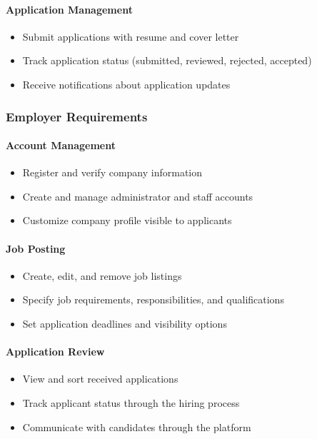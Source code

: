 \documentclass[12pt,a4paper]{article}
\begin{document}
\paragraph{Application Management}
\begin{itemize}
    \item Submit applications with resume and cover letter
    \item Track application status (submitted, reviewed, rejected, accepted)
    \item Receive notifications about application updates
\end{itemize}

\subsubsection{Employer Requirements}

\paragraph{Account Management}
\begin{itemize}
    \item Register and verify company information
    \item Create and manage administrator and staff accounts
    \item Customize company profile visible to applicants
\end{itemize}

\paragraph{Job Posting}
\begin{itemize}
    \item Create, edit, and remove job listings
    \item Specify job requirements, responsibilities, and qualifications
    \item Set application deadlines and visibility options
\end{itemize}

\paragraph{Application Review}
\begin{itemize}
    \item View and sort received applications
    \item Track applicant status through the hiring process
    \item Communicate with candidates through the platform
\end{itemize}
\end{document}
